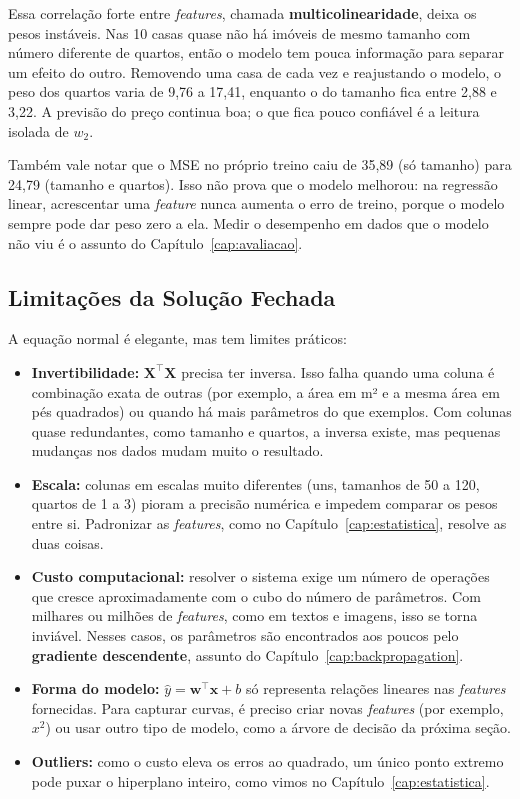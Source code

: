 \documentclass[a4paper,12pt,openany]{book}
\begin{document}
Essa correlação forte entre \textit{features}, chamada \textbf{multicolinearidade}, deixa os pesos instáveis. Nas 10 casas quase não há imóveis de mesmo tamanho com número diferente de quartos, então o modelo tem pouca informação para separar um efeito do outro. Removendo uma casa de cada vez e reajustando o modelo, o peso dos quartos varia de 9,76 a 17,41, enquanto o do tamanho fica entre 2,88 e 3,22. A previsão do preço continua boa; o que fica pouco confiável é a leitura isolada de \(w_2\).

Também vale notar que o MSE no próprio treino caiu de 35,89 (só tamanho) para 24,79 (tamanho e quartos). Isso não prova que o modelo melhorou: na regressão linear, acrescentar uma \textit{feature} nunca aumenta o erro de treino, porque o modelo sempre pode dar peso zero a ela. Medir o desempenho em dados que o modelo não viu é o assunto do Capítulo~\ref{cap:avaliacao}.

\subsection{Limitações da Solução Fechada}

A equação normal é elegante, mas tem limites práticos:
\begin{itemize}
    \item \textbf{Invertibilidade:} \(\mathbf{X}^\top\mathbf{X}\) precisa ter inversa. Isso falha quando uma coluna é combinação exata de outras (por exemplo, a área em m² e a mesma área em pés quadrados) ou quando há mais parâmetros do que exemplos. Com colunas quase redundantes, como tamanho e quartos, a inversa existe, mas pequenas mudanças nos dados mudam muito o resultado.
    \item \textbf{Escala:} colunas em escalas muito diferentes (uns, tamanhos de 50 a 120, quartos de 1 a 3) pioram a precisão numérica e impedem comparar os pesos entre si. Padronizar as \textit{features}, como no Capítulo~\ref{cap:estatistica}, resolve as duas coisas.
    \item \textbf{Custo computacional:} resolver o sistema exige um número de operações que cresce aproximadamente com o cubo do número de parâmetros. Com milhares ou milhões de \textit{features}, como em textos e imagens, isso se torna inviável. Nesses casos, os parâmetros são encontrados aos poucos pelo \textbf{gradiente descendente}, assunto do Capítulo~\ref{cap:backpropagation}.
    \item \textbf{Forma do modelo:} \(\hat{y} = \mathbf{w}^\top\mathbf{x} + b\) só representa relações lineares nas \textit{features} fornecidas. Para capturar curvas, é preciso criar novas \textit{features} (por exemplo, \(x^2\)) ou usar outro tipo de modelo, como a árvore de decisão da próxima seção.
    \item \textbf{Outliers:} como o custo eleva os erros ao quadrado, um único ponto extremo pode puxar o hiperplano inteiro, como vimos no Capítulo~\ref{cap:estatistica}.
\end{itemize}
\end{document}
